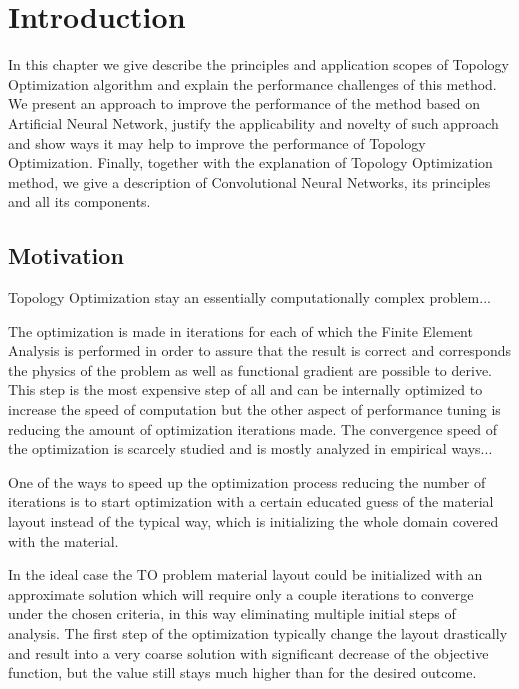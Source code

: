 
\chapter{Introduction}
\label{chapter:Introduction}

In this chapter we give describe the principles and application scopes of Topology Optimization algorithm and explain the performance challenges of this method.
We present an approach to improve the performance of the method based on Artificial Neural Network, justify the applicability and novelty of such approach and show ways it may help to improve the performance of Topology Optimization. 
Finally, together with the explanation of Topology Optimization method, we give a description of Convolutional Neural Networks, its principles and all its components.


\section{Motivation}

	Topology Optimization stay an essentially computationally complex problem...
\medskip

The optimization is made in iterations for each of which the Finite Element Analysis is performed in order to assure that the result is correct and corresponds the physics of the problem as well as functional gradient are possible to derive.
This step is the most expensive step of all and can be internally optimized to increase the speed of computation but the other aspect of performance tuning is reducing the amount of optimization iterations made.
The convergence speed of the optimization is scarcely studied and is mostly analyzed in empirical ways...
\medskip

One of the ways to speed up the optimization process reducing the number of iterations is to start optimization with a certain educated guess of the material layout instead of the typical way, which is initializing the whole domain covered with the material.

\medskip
In the ideal case the TO problem material layout could be initialized with an approximate solution which will require only a couple iterations to converge under the chosen criteria, in this way eliminating multiple initial steps of analysis.
The first step of the optimization typically change the layout drastically and result into a very coarse solution with significant decrease of the objective function, but the value still stays much higher than for the desired outcome. 
\medskip

